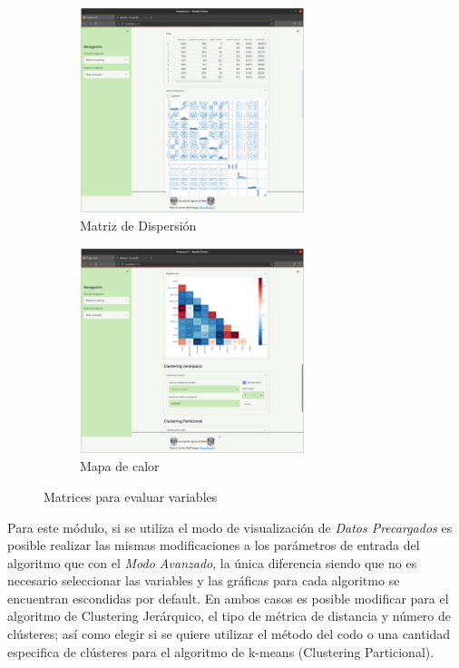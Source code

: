 \documentclass[10pt]{article}
\begin{document}
    \begin{figure}[H]
    
    \begin{subfigure}{0.5\textwidth}
    \centering
    \includegraphics[height=6cm]{img/Clustering_dispersion.png} 
    \caption{Matriz de Dispersión}
    \label{fig:ClusteringDisp}
    \end{subfigure}
    \begin{subfigure}{0.5\textwidth}
    \centering
    \includegraphics[height=6cm]{img/Clustering_HeatMap.png}
    \caption{Mapa de calor}
    \label{fig:ClustringHM}
    \end{subfigure}
    
    \caption{Matrices para evaluar variables}
    \label{fig:ClusteringDatos}
    \end{figure}
    
    Para este módulo, si se utiliza el modo de visualización de \textit{Datos Precargados} es posible realizar las mismas modificaciones a los parámetros de entrada del algoritmo que con el \textit{Modo Avanzado}, la única diferencia siendo que no es necesario seleccionar las variables y las gráficas para cada algoritmo se encuentran escondidas por default. En ambos casos es posible modificar para el algoritmo de Clustering Jerárquico, el tipo de métrica de distancia y número de clústeres; así como elegir si se quiere utilizar el método del codo o una cantidad especifica de clústeres para el algoritmo de k-means (Clustering Particional).
    
\end{document}
